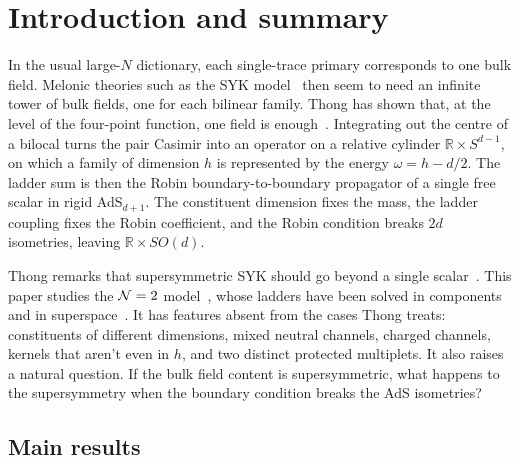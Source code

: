 \section{Introduction and summary}
\label{sec:intro}

In the usual large-$N$ dictionary, each single-trace primary corresponds to one bulk field. Melonic theories such as the SYK model~\cite{Maldacena:2016hyu,Kitaev} then seem to need an infinite tower of bulk fields, one for each bilinear family. Thong has shown that, at the level of the four-point function, one field is enough~\cite{Thong:2026}. Integrating out the centre of a bilocal turns the pair Casimir into an operator on a relative cylinder $\mathbb R\times S^{d-1}$, on which a family of dimension $h$ is represented by the energy $\omega=h-d/2$. The ladder sum is then the Robin boundary-to-boundary propagator of a single free scalar in rigid AdS$_{d+1}$. The constituent dimension fixes the mass, the ladder coupling fixes the Robin coefficient, and the Robin condition breaks $2d$ isometries, leaving $\mathbb R\times SO(d)$.

Thong remarks that supersymmetric SYK should go beyond a single scalar~\cite[p.~6]{Thong:2026}. This paper studies the $\mathcal{N}=2$ model~\cite{Fu:2016vas}, whose ladders have been solved in components~\cite{Peng:2017spg} and in superspace~\cite{Bulycheva:2018qcp}. It has features absent from the cases Thong treats: constituents of different dimensions, mixed neutral channels, charged channels, kernels that aren't even in $h$, and two distinct protected multiplets. It also raises a natural question. If the bulk field content is supersymmetric, what happens to the supersymmetry when the boundary condition breaks the AdS isometries?

\subsection*{Main results}

